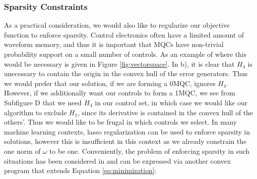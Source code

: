 \documentclass[aps,nofootinbib,pra,notitlepage,twocolumn]{revtex4-1}
\begin{document}

\subsubsection{Sparsity Constraints}
As a practical consideration, we would also like to regularize our objective function to enforce sparsity. Control electronics often have a limited amount of waveform memory, and thus it is important that MQCs have non-trivial probability support on a small number of controls. As an example of where this would be necessary is given in Figure \ref{fig:vectorspace}. In b), it is clear that $H_4$ is unecessary to contain the origin in the convex hull of the error generators. Thus we would prefer that our solution, if we are forming a $0$MQC, ignores $H_4$. However, if we additionally want our controls to form a 1MQC, we see from Subfigure D that we need $H_4$ in our control set, in which case we would like our algorithm to exclude $H_1$, since its derivative is contained in the convex hull of the others'. Thus we would like to be frugal in which controls we select. In many machine learning contexts, lasso regularization \cite{tibshirani1996regression} can be used to enforce sparsity in solutions, however this is insufficient in this context as we already constrain the one norm of $\omega$ to be one. Conveniently, the problem of enforcing sparsity in such situations has been considered in \cite{NIPS2012_4504} and can be expressed via another convex program that extends Equation \ref{eq:minimization}:
\end{document}
